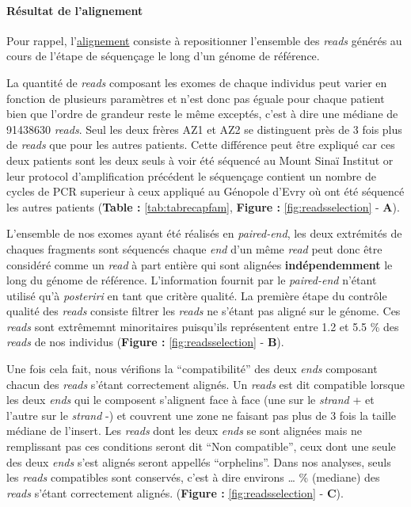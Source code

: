 \documentclass[12pt,twoside]{reedthesis}
\theoremstyle{definition}
\theoremstyle{definition}
\theoremstyle{remark}
\begin{document}
  \paragraph{Résultat de l'alignement}\label{resultat-de-lalignement}
  
  Pour rappel, l'\href{\%7B\#lalignement\%7D}{alignement} consiste à
  repositionner l'ensemble des \emph{reads} générés au cours de l'étape de
  séquençage le long d'un génome de référence.
  
  La quantité de \emph{reads} composant les exomes de chaque individus
  peut varier en fonction de plusieurs paramètres et n'est donc pas éguale
  pour chaque patient bien que l'ordre de grandeur reste le même exceptés,
  c'est à dire une médiane de 91438630 \emph{reads}. Seul les deux frères
  AZ1 et AZ2 se distinguent près de 3 fois plus de \emph{reads} que pour
  les autres patients. Cette différence peut être expliqué car ces deux
  patients sont les deux seuls à voir été séquencé au Mount Sinaï Institut
  or leur protocol d'amplification précédent le séquençage contient un
  nombre de cycles de PCR superieur à ceux appliqué au Génopole d'Evry où
  ont été séquencé les autres patients (\textbf{Table :}
  \ref{tab:tabrecapfam}, \textbf{Figure : }\ref{fig:readsselection} -
  \textbf{A}).
  
  L'ensemble de nos exomes ayant été réalisés en \emph{paired-end}, les
  deux extrémités de chaques fragments sont séquencés chaque \emph{end}
  d'un même \emph{read} peut donc être considéré comme un \emph{read} à
  part entière qui sont alignées \textbf{indépendemment} le long du génome
  de référence. L'information fournit par le \emph{paired-end} n'étant
  utilisé qu'à \emph{posteriri} en tant que critère qualité. La première
  étape du contrôle qualité des \emph{reads} consiste filtrer les
  \emph{reads} ne s'étant pas aligné sur le génome. Ces \emph{reads} sont
  extrêmemnt minoritaires puisqu'ils représentent entre 1.2 et 5.5 \% des
  \emph{reads} de nos individus (\textbf{Figure :
  }\ref{fig:readsselection} - \textbf{B}).
  
  Une fois cela fait, nous vérifions la ``compatibilité'' des deux
  \emph{ends} composant chacun des \emph{reads} s'étant correctement
  alignés. Un \emph{reads} est dit compatible lorsque les deux \emph{ends}
  qui le composent s'alignent face à face (une sur le \emph{strand} + et
  l'autre sur le \emph{strand} -) et couvrent une zone ne faisant pas plus
  de 3 fois la taille médiane de l'insert. Les \emph{reads} dont les deux
  \emph{ends} se sont alignées mais ne remplissant pas ces conditions
  seront dit ``Non compatible'', ceux dont une seule des deux \emph{ends}
  s'est alignés seront appellés ``orphelins''. Dans nos analyses, seuls
  les \emph{reads} compatibles sont conservés, c'est à dire environs
  \ldots{} \% (mediane) des \emph{reads} s'étant correctement alignés.
  (\textbf{Figure : }\ref{fig:readsselection} - \textbf{C}).
  
\end{document}
